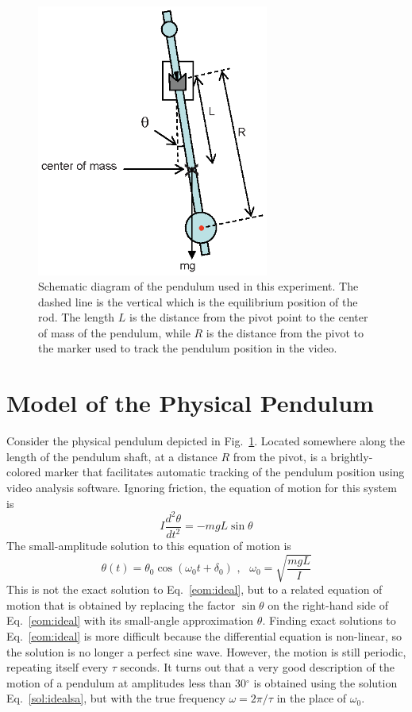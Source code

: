 \documentclass{revtex4}
\begin{document}
\begin{figure}
\includegraphics[width=3in]{pendu.eps}
\caption{\label{fig:pendu}
Schematic diagram of the pendulum used in this experiment. The dashed line
is the vertical which is the equilibrium position of the rod.  The length
$L$ is the distance from the pivot point to the center of mass of the 
pendulum, while $R$ is the distance from the pivot to the marker used to
track the pendulum position in the video.
}
\end{figure}

\section{Model of the Physical Pendulum}

Consider the physical pendulum depicted in Fig.~\ref{fig:pendu}.  Located
somewhere along the length of the pendulum shaft, at a distance $R$ from
the pivot, is a brightly-colored marker that facilitates
automatic tracking of the pendulum position using video analysis software.
Ignoring friction, the equation of motion for this system is
\begin{equation}
I\frac{d^2\theta}{dt^2} = -mgL \sin{\theta}
\label{eom:ideal}
\end{equation}
The small-amplitude solution to this equation of motion is
\begin{equation}
\theta(t)=\theta_0 \cos(\omega_0 t + \delta_0)\,\,
,\,\,\,\,\omega_0=\sqrt{\frac{mgL}{I}}
\label{sol:idealsa}
\end{equation}
This is not the exact solution to Eq.~\ref{eom:ideal}, but to a related
equation of motion that is obtained by replacing the factor $\sin{\theta}$
on the right-hand side of Eq.~\ref{eom:ideal} with its small-angle
approximation $\theta$.  Finding exact solutions to Eq.~\ref{eom:ideal}
is more difficult because the differential equation is non-linear, so the
solution is no longer a perfect sine wave.  However, the motion is still
periodic, repeating itself every $\tau$ seconds.  It turns out that a very
good description of the motion of a pendulum at amplitudes less than
30$^{\circ}$ is obtained using the solution Eq.~\ref{sol:idealsa}, but
with the true frequency $\omega=2\pi/\tau$ in the place of $\omega_0$.
\end{document}
